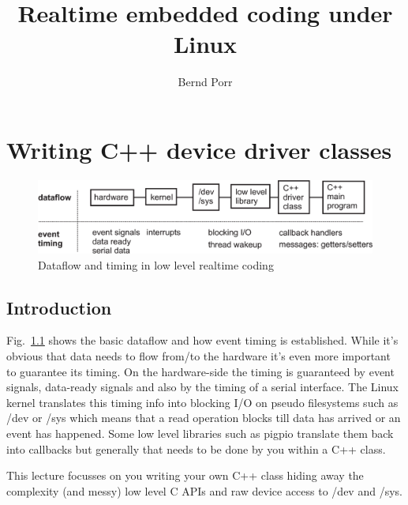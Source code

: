 \documentclass[12pt]{report}
\author{Bernd Porr}
\title{Realtime embedded coding under Linux}
\begin{document}
\maketitle

\tableofcontents

\chapter{Writing C++ device driver classes}

\begin{figure}[!hbt]
\begin{center}
\mbox{\includegraphics[width=\textwidth]{signals-timings}}
\end{center}
\caption{Dataflow and timing in low level realtime coding
\label{timing}}
\end{figure}

\section{Introduction}
Fig.~\ref{timing} shows the basic dataflow and how event timing
is established. While it's obvious that data needs to flow
from/to the hardware it's even more important to guarantee
its timing. On the hardware-side the timing is guaranteed
by event signals, data-ready signals and also by the timing
of a serial interface. The Linux kernel translates this
timing info into blocking I/O on pseudo filesystems such as /dev or /sys
which means that a read
operation blocks till data has arrived or an event has
happened. Some low level libraries such as pigpio
translate them back into callbacks but generally that
needs to be done by you within a C++ class.

This lecture focusses on you writing your own C++ class hiding away
the complexity (and messy) low level C APIs and raw device
access to /dev and /sys.
\end{document}
